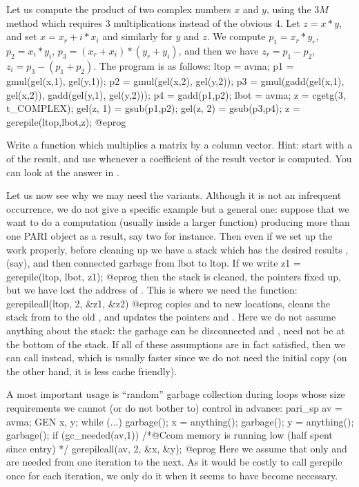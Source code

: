  Let us compute the product of two complex
numbers $x$ and $y$, using the $3M$ method which requires 3 multiplications
instead of the obvious 4. Let $z = x*y$, and set $x = x_r + i*x_i$ and
similarly for $y$ and $z$. We compute $p_1 = x_r*y_r$, $p_2=x_i*y_i$,
$p_3=(x_r+x_i)*(y_r+y_i)$, and then we have $z_r=p_1-p_2$,
$z_i=p_3-(p_1+p_2)$. The program is as follows:
%
\bprog
ltop = avma;
p1 = gmul(gel(x,1), gel(y,1));
p2 = gmul(gel(x,2), gel(y,2));
p3 = gmul(gadd(gel(x,1), gel(x,2)), gadd(gel(y,1), gel(y,2)));
p4 = gadd(p1,p2);
lbot = avma; z = cgetg(3, t_COMPLEX);
gel(z, 1) = gsub(p1,p2);
gel(z, 2) = gsub(p3,p4); z = gerepile(ltop,lbot,z);
@eprog

 Write a function which multiplies a matrix by a column
vector. Hint: start with a  of the result, and use 
whenever a coefficient of the result vector is computed. You can look at the
answer in .


Let us now see why we may need the  variants. Although it
is not an infrequent occurrence, we do not give a specific example but a
general one: suppose that we want to do a computation (usually inside a
larger function) producing more than one PARI object as a result, say two for
instance. Then even if we set up the work properly, before cleaning up we
have a stack which has the desired results ,  (say), and
then connected garbage from lbot to ltop. If we write
\bprog
  z1 = gerepile(ltop, lbot, z1);
@eprog\noindent
then the stack is cleaned, the pointers fixed up, but we have lost the
address of . This is where we need the 
function:
\bprog
  gerepileall(ltop, 2, &z1, &z2)
@eprog
\noindent copies  and  to new locations, cleans the stack
from  to the old , and updates the pointers  and
. Here we do not assume anything about the stack: the garbage can be
disconnected and ,  need not be at the bottom of the stack.
If all of these assumptions are in fact satisfied, then we can call
 instead, which is usually faster since we do not need
the initial copy (on the other hand, it is less cache friendly).

A most important usage is ``random'' garbage collection during loops
whose size requirements we cannot (or do not bother to) control in advance:
\bprog
  pari_sp av = avma;
  GEN x, y;
  while (...)
  {
    garbage(); x = anything();
    garbage(); y = anything(); garbage();
    if (gc_needed(av,1)) /*@Ccom memory is running low (half spent since entry) */
      gerepileall(av, 2, &x, &y);
  }
@eprog
\noindent Here we assume that only  and  are needed from one
iteration to the next. As it would be costly to call gerepile once for each
iteration, we only do it when it seems to have become necessary.

